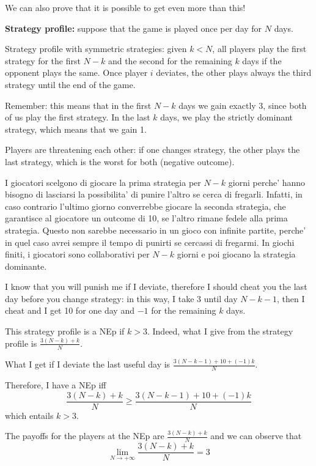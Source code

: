 \noindent We can also prove that it is possible to get even more than this!

\bigskip
\noindent \textbf{Strategy profile:} suppose that the game is played once per day for $N$ days.

\noindent Strategy profile with symmetric strategies: given $k < N$, all players play the first strategy for the first $N-k$ and the second for the remaining $k$ days if the opponent plays the same. Once player $i$ deviates, the other plays always the third strategy until the end of the game.

\bigskip
\noindent Remember: this means that in the first $N-k$ days we gain exactly 
3, since both of us play the first strategy. In the last $k$ days, we play the 
strictly dominant strategy, which means that we gain 1.

\noindent Players are threatening each other: if one changes strategy, the other 
plays the last strategy, which is the worst for both (negative outcome).

\noindent I giocatori scelgono di giocare la prima strategia per $N-k$ giorni perche' hanno bisogno di lasciarsi la possibilita' di punire l'altro se cerca di 
fregarli. Infatti, in caso contrario l'ultimo giorno converrebbe giocare la 
seconda strategia, che garantisce al giocatore un outcome di 10, se l'altro 
rimane fedele alla prima strategia. Questo non sarebbe necessario in un gioco 
con infinite partite, perche' in quel caso avrei sempre il tempo di punirti se 
cercassi di fregarmi. In giochi finiti, i giocatori sono collaborativi per 
$N-k$ giorni e poi giocano la strategia dominante.

\bigskip
\noindent I know that you will punish me if I deviate, therefore I should 
cheat you the last day before you change strategy: in this way, I take 3 
until day $N-k-1$, then I cheat and I get 10 for one day and $-1$ for the 
remaining $k$ days.

\bigskip
\noindent This strategy profile is a NEp if $k > 3$. Indeed, what I give from the strategy profile is
$\frac{3(N-k) + k}{N}$.

\noindent What I get if I deviate the last useful day is $\frac{3(N-k-1) + 10 + (-1)k}{N}$.

\noindent Therefore, I have a NEp iff
\[
	\frac{3(N-k) + k}{N} \geq \frac{3(N-k-1) + 10 + (-1)k}{N} 
\]
which entails $k > 3$.

\bigskip
\noindent The payoffs for the players at the NEp are $\frac{3(N-k) + k}{N}$ and we can observe that
\[
	\lim\limits_{N \rightarrow + \infty}\frac{3(N-k) + k}{N} = 3
\]

